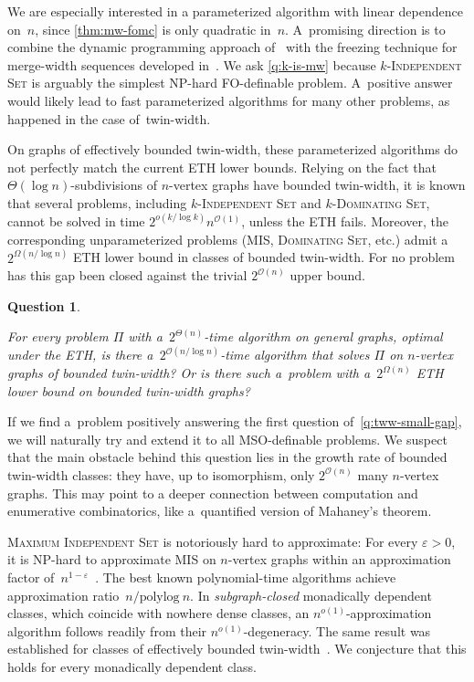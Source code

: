 \documentclass[a4paper,11pt]{article}
\newcommand{\fo}{\textsf{FO}\xspace}
\newcommand{\mso}{\textsf{MSO}\xspace}
\newcommand{\mis}{\textsc{Maximum Independent Set}\xspace}
\newcommand{\smis}{\textsc{MIS}\xspace}
\newcommand{\Oh}{\mathcal{O}}
\newtheorem{quest}{Question}
\newenvironment{question}
  {\begin{quest}\begin{mdframed}[style=questionstyle]}
  {\end{mdframed}\end{quest}}
\begin{document}
We are especially interested in a parameterized algorithm with linear dependence on~$n$, since \cref{thm:mw-fomc} is only quadratic in~$n$.
A~promising direction is to combine the dynamic programming approach of~\cite{twin-width3} with the freezing technique for merge-width sequences developed in~\cite{Bonamy25}.
We ask \cref{q:k-is-mw} because \textsc{$k$-Independent Set} is arguably the simplest NP-hard \fo-definable problem.
A~positive answer would likely lead to fast parameterized algorithms for many other problems, as happened in the case of~twin-width.

On graphs of effectively bounded twin-width, these parameterized algorithms do not perfectly match the current ETH lower bounds.
Relying on the fact that $\Theta(\log n)$-subdivisions of $n$-vertex graphs have bounded twin-width, it is known that several problems, including \textsc{$k$-Independent Set} and \textsc{$k$-Dominating Set}, cannot be solved in time $2^{o(k/\log k)} n^{\Oh(1)}$, unless the ETH fails. 
Moreover, the corresponding unparameterized problems (\smis, \textsc{Dominating Set}, etc.) admit a~$2^{\Omega(n/\log n)}$ ETH lower bound in classes of bounded twin-width.
For no problem has this gap been closed against the trivial $2^{\Oh(n)}$ upper bound.  

\begin{question}\label{q:tww-small-gap}
For every problem $\Pi$ with a~$2^{\Theta(n)}$-time algorithm on general graphs, optimal under the ETH, is there a~$2^{\Oh(n/\log n)}$-time algorithm that solves $\Pi$ on $n$-vertex graphs of bounded twin-width?
Or is there such a~problem with a~$2^{\Omega(n)}$ ETH lower bound on bounded twin-width graphs?
\end{question}

If we find a~problem positively answering the first question of~\cref{q:tww-small-gap}, we will naturally try and extend it to all \mso-definable problems.
We suspect that the main obstacle behind this question lies in the growth rate of bounded twin-width classes: they have, up to isomorphism, only $2^{\Oh(n)}$ many $n$-vertex graphs.
This may point to a deeper connection between computation and enumerative combinatorics, like a~quantified version of Mahaney's theorem. 

\mis is notoriously hard to approximate: For every $\varepsilon > 0$, it is NP-hard to approximate \smis on $n$-vertex graphs within an approximation factor of~$n^{1-\varepsilon}$~\cite{Hastad96,Zuckerman07}.
The best known polynomial-time algorithms achieve approximation ratio~$n/\text{polylog}~n$.
In \emph{subgraph-closed} monadically dependent classes, which coincide with nowhere dense classes, an $n^{o(1)}$-approximation algorithm follows readily from their $n^{o(1)}$-degeneracy.   
The same result was established for classes of effectively bounded twin-width~\cite{BergeBDW23}.
We conjecture that this holds for every monadically dependent class.
\end{document}
